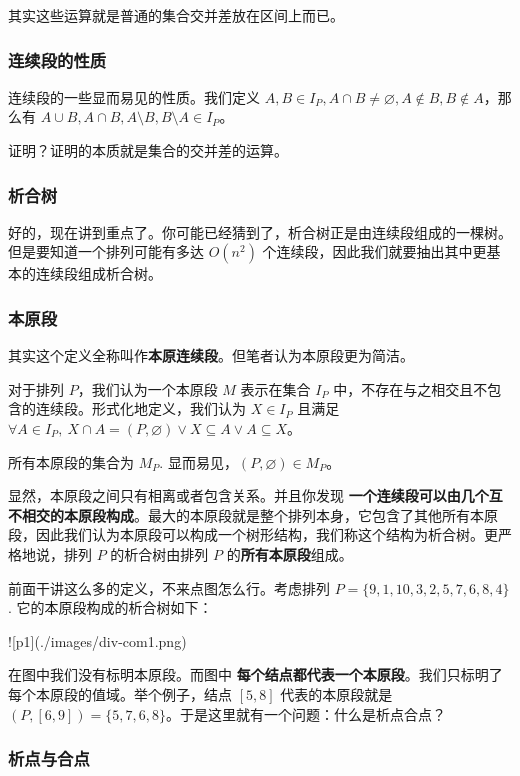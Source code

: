 \documentclass[12pt]{ctexart}
\begin{document}
其实这些运算就是普通的集合交并差放在区间上而已。

\subsubsection{连续段的性质}

连续段的一些显而易见的性质。我们定义 $A,B\in I_P,A \cap B \neq \varnothing,A \notin B,B \notin A$，那么有 $A\cup B,A\cap B,A\setminus B,B\setminus A\in I_P$。

证明？证明的本质就是集合的交并差的运算。

\subsubsection{析合树}

好的，现在讲到重点了。你可能已经猜到了，析合树正是由连续段组成的一棵树。但是要知道一个排列可能有多达 $O(n^2)$ 个连续段，因此我们就要抽出其中更基本的连续段组成析合树。

\subsubsection{本原段}

其实这个定义全称叫作\textbf{本原连续段}。但笔者认为本原段更为简洁。

对于排列 $P$，我们认为一个本原段 $M$ 表示在集合 $I_P$ 中，不存在与之相交且不包含的连续段。形式化地定义，我们认为 $X\in I_P$ 且满足 $\forall A\in I_P,\ X\cap A= (P,\varnothing)\vee X\subseteq A\vee A\subseteq X$。

所有本原段的集合为 $M_P$. 显而易见，$(P,\varnothing)\in M_P$。

显然，本原段之间只有相离或者包含关系。并且你发现 \textbf{一个连续段可以由几个互不相交的本原段构成}。最大的本原段就是整个排列本身，它包含了其他所有本原段，因此我们认为本原段可以构成一个树形结构，我们称这个结构为析合树。更严格地说，排列 $P$ 的析合树由排列 $P$ 的\textbf{所有本原段}组成。

前面干讲这么多的定义，不来点图怎么行。考虑排列 $P=\{9,1,10,3,2,5,7,6,8,4\}$. 它的本原段构成的析合树如下：

![p1](./images/div-com1.png)

在图中我们没有标明本原段。而图中 \textbf{每个结点都代表一个本原段}。我们只标明了每个本原段的值域。举个例子，结点 $[5,8]$ 代表的本原段就是 $(P,[6,9])=\{5,7,6,8\}$。于是这里就有一个问题：什么是析点合点？

\subsubsection{析点与合点}
\end{document}

